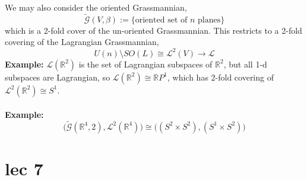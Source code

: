 \documentclass[12pt]{report}
\theoremstyle{definition}
\theoremstyle{remark}
\numberwithin{equation}{section}
\theoremstyle{definition}
\newcommand{\bb}[1]{\mathbb{#1}}
\renewcommand{\tilde}{\widetilde}
\begin{document}
We may also consider the oriented Grassmannian, 
$$
	\tilde{\mathcal{G}}(V,\beta) := \{\text{oriented set of } n \text{ planes} \}
$$
which is a 2-fold cover of the un-oriented Grassmannian. This restricts to a 2-fold covering of the Lagrangian Grassmannian, 
$$
	U(n)\setminus SO(L) \cong \mathcal{L}^2(V) \to \mathcal{L}
$$
\textbf{Example: }$\mathcal{L}(\bb R^2)$ is the set of Lagrangian subspaces of $\bb R^2$, but all 1-d subspaces are Lagrangian, so $\mathcal{L}(\bb R^2) \cong \bb RP^1$, which has 2-fold covering of $\mathcal{L}^2(\bb R^2) \cong S^1$. \\\\
\textbf{Example: } 
$$
	\Big(\tilde{\mathcal{G}}(\bb R^4,2), \mathcal{L}^2(\bb R^4)	\Big) \cong \Big((S^2 \times S^2), (S^1 \times S^2) \Big)
$$
\chapter{lec 7}
\end{document}
